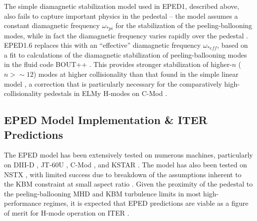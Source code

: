 The simple diamagnetic stabilization model used in EPED1, described above, also fails to capture important physics in the pedestal -- the model assumes a constant diamagnetic frequency $\omega_{*pi}$ for the stabilization of the peeling-ballooning modes, while in fact the diamagnetic frequency varies rapidly over the pedestal \cite{Snyder2010}.  EPED1.6 replaces this with an ``effective'' diamagnetic frequency $\omega_{*eff}$, based on a fit to calculations of the diamagnetic stabilization of peeling-ballooning modes in the fluid code BOUT++ \cite{Dudson2009,Xu2010,Xia2013}.  This provides stronger stabilization of higher-$n$ ($n > \sim 12$) modes at higher collisionality than that found in the simple linear model \cite{Snyder2011,Hughes2013}, a correction that is particularly necessary for the comparatively high-collisionality pedestals in ELMy H-modes on C-Mod \cite{Hughes2013}.

\subsection{EPED Model Implementation \& ITER Predictions}\label{subsec:mod_eped_iter}

The EPED model has been extensively tested on numerous machines, particularly on DIII-D \cite{Snyder2011,Groebner2013}, JT-60U \cite{Snyder2009a}, C-Mod \cite{Walk2012}, and KSTAR \cite{Han2013}.  The model has also been tested on NSTX \cite{Groebner2013}, with limited success due to breakdown of the assumptions inherent to the KBM constraint at small aspect ratio \cite{Snyder2009a}.  Given the proximity of the pedestal to the peeling-ballooning MHD and KBM turbulence limits in most high-performance regimes, it is expected that EPED predictions are viable as a figure of merit for H-mode operation on ITER \cite{Snyder2011,Snyder2012}.


